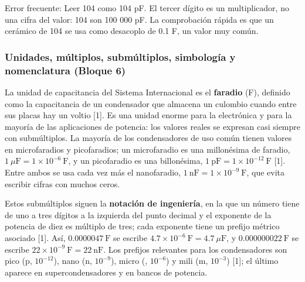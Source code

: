 \documentclass[11pt,letterpaper]{article}
\begin{document}
\begin{nota}{Error frecuente:}
Leer \guillemotleft{}104\guillemotright{} como 104 pF. El tercer dígito es un multiplicador, no una cifra del valor: 104 son 100 000 pF. La comprobación rápida es que un cerámico de 104 se usa como desacoplo de 0.1 \textmu{}F, un valor muy común.
\end{nota}

\subsubsection{Unidades, múltiplos, submúltiplos, simbología y nomenclatura (Bloque 6)}

La unidad de capacitancia del Sistema Internacional es el \textbf{faradio} (F), definido como la capacitancia de un condensador que almacena un culombio cuando entre sus placas hay un voltio [1]. Es una unidad enorme para la electrónica y para la mayoría de las aplicaciones de potencia: los valores reales se expresan casi siempre con submúltiplos. La mayoría de los condensadores de uso común tienen valores en microfaradios y picofaradios; un microfaradio es una millonésima de faradio, $1\ \mu\text{F} = 1 \times 10^{-6}\ \text{F}$, y un picofaradio es una billonésima, $1\ \text{pF} = 1 \times 10^{-12}\ \text{F}$ [1]. Entre ambos se usa cada vez más el nanofaradio, $1\ \text{nF} = 1 \times 10^{-9}\ \text{F}$, que evita escribir cifras con muchos ceros.

Estos submúltiplos siguen la \textbf{notación de ingeniería}, en la que un número tiene de uno a tres dígitos a la izquierda del punto decimal y el exponente de la potencia de diez es múltiplo de tres; cada exponente tiene un prefijo métrico asociado [1]. Así, $0.0000047\ \text{F}$ se escribe $4.7 \times 10^{-6}\ \text{F} = 4.7\ \mu\text{F}$, y $0.000000022\ \text{F}$ se escribe $22 \times 10^{-9}\ \text{F} = 22\ \text{nF}$. Los prefijos relevantes para los condensadores son pico (p, $10^{-12}$), nano (n, $10^{-9}$), micro (\textmu{}, $10^{-6}$) y mili (m, $10^{-3}$) [1]; el último aparece en supercondensadores y en bancos de potencia.
\end{document}
